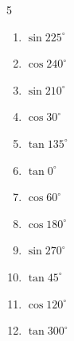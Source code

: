 \begin{multicols}{5}
\begin{enumerate}

  \item $\displaystyle \sin{225^\circ}$


  \item $\displaystyle \cos{240^\circ}$


  \item $\displaystyle \sin{210^\circ}$


  \item $\displaystyle \cos{30^\circ}$


  \item $\displaystyle \tan{135^\circ}$

        \phantom{$\displaystyle =-1$}

  \item $\displaystyle \tan{0^\circ}$

        \phantom{$\displaystyle =0$}

  \item $\displaystyle \cos{60^\circ}$


  \item $\displaystyle \cos{180^\circ}$

        \phantom{$\displaystyle =-1$}

  \item $\displaystyle \sin{270^\circ}$

        \phantom{$\displaystyle =-1$}

\columnbreak %

  \item $\displaystyle \tan{45^\circ}$

        \phantom{$\displaystyle =1$}

  \item $\displaystyle \cos{120^\circ}$


  \item $\displaystyle \tan{300^\circ}$



\end{enumerate}
\end{multicols}
